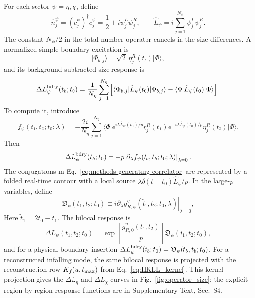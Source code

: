 \documentclass[pdflatex,sn-nature]{sn-jnl}
\begin{document}
For each sector \(\psi=\eta,\chi\), define
\begin{equation}
\hat n^\psi_j
=
\left(c^\psi_j\right)^\dagger c^\psi_j
=
\frac{1}{2}
+i\psi^L_j\psi^R_j,
\qquad
\hat L_\psi=i\sum_{j=1}^{N_\psi}\psi^L_j\psi^R_j .
\label{eq:methods-size-operator}
\end{equation}
The constant \(N_\psi/2\) in the total number operator cancels in the size differences. A normalized simple boundary excitation is
\begin{equation}
\lvert\Phi_{b,j}\rangle=\sqrt{2}\,\eta^R_j(t_b)\lvert\Phi\rangle ,
\label{eq:methods-boundary-excitation}
\end{equation}
and its background-subtracted size response is
\begin{equation}
\Delta L^{\rm bdry}_\psi(t_b;t_0)
=\frac{1}{N_\eta}\sum_{j=1}^{N_\eta}
\left[
\langle\Phi_{b,j}\rvert\hat L_\psi(t_0)\lvert\Phi_{b,j}\rangle
-\langle\Phi\rvert\hat L_\psi(t_0)\lvert\Phi\rangle
\right].
\label{eq:methods-boundary-size}
\end{equation}
To compute it, introduce
\begin{equation}
f_\psi(t_1,t_2;t_0;\lambda)
=-\frac{2i}{N_\eta}\sum_{j=1}^{N_\eta}
\langle\Phi\rvert
 e^{i\lambda\hat L_\psi(t_0)/p}\eta^R_j(t_1)
 e^{-i\lambda\hat L_\psi(t_0)/p}\eta^R_j(t_2)
\lvert\Phi\rangle.
\label{eq:methods-generating-correlator}
\end{equation}
Then
\begin{equation}
\Delta L^{\rm bdry}_\psi(t_b;t_0)
=
-p\left.\partial_\lambda
f_\psi(t_b,t_b;t_0;\lambda)
\right|_{\lambda=0}.
\label{eq:methods-response-from-generating}
\end{equation}
The conjugations in Eq.~\eqref{eq:methods-generating-correlator} are represented by a folded real-time contour with a local source \(\lambda\delta(t-t_0)\hat L_\psi/p\). In the large-\(p\) variables, define
\begin{equation}
\mathfrak D_\psi(t_1,t_2;t_0)
\equiv
i\left.
\partial_\lambda
g^\eta_{R,\psi}(\widetilde t_1,t_2;t_0,\lambda)
\right|_{\lambda=0},
\label{eq:methods-D-definition}
\end{equation}
Here \(\widetilde t_1=2t_0-t_1\). The bilocal response is
\begin{equation}
\Delta L_\psi(t_1,t_2;t_0)
=
\exp\left[
\frac{g^\eta_{R,0}(t_1,t_2)}{p}
\right]
\mathfrak D_\psi(t_1,t_2;t_0),
\label{eq:methods-bilocal-size}
\end{equation}
and for a physical boundary insertion \(\Delta L^{\rm bdry}_\psi(t_b;t_0)=\mathfrak D_\psi(t_b,t_b;t_0)\). For a reconstructed infalling mode, the same bilocal response is projected with the reconstruction row \(K_f(u,t_{\rm max})\) from Eq.~\eqref{eq:HKLL_kernel}. This kernel projection gives the \(\Delta L_\eta\) and \(\Delta L_\chi\) curves in Fig.~\ref{fig:operator_size}; the explicit region-by-region response functions are in Supplementary Text, Sec.~S4.
\end{document}
